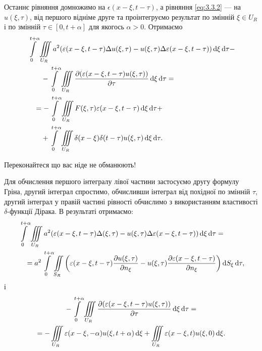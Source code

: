 Останнє рівняння домножимо на $\epsilon(x - \xi, t - \tau)$, а рівняння \eqref{eq:3.3.2} --- на $u(\xi, \tau)$, від першого відніме друге та проінтегруємо результат по змінній $\xi \in U_R$ і по змінній $\tau \in [0, t + \alpha]$ для якогось $\alpha > 0$. Отримаємо
\begin{equation}
	\begin{aligned}
		& \Int_0^{t + \alpha} \Iiint_{U_R} a^2 (\epsilon(x - \xi, t - \tau) \Delta u(\xi, \tau) - u(\xi, \tau) \Delta \epsilon(x - \xi, t - \tau)) \diff \xi \diff \tau - \\
		& \qquad - \Int_0^{t + \alpha} \Iiint_{U_R} \frac{\partial (\epsilon(x - \xi, t - \tau) u(\xi, \tau))}{\partial \tau} \diff \xi \diff \tau = \\
		& \quad = - \Int_0^{t + \alpha} \Iiint_{U_R} F(\xi, \tau) \epsilon(x - \xi, t - \tau) \diff \xi \diff \tau + \\
		& \qquad + \Int_0^{t + \alpha} \Iiint_{U_R} \delta(x - \xi) \delta(t - \tau) u(\xi, \tau) \diff \xi \diff \tau.
	\end{aligned}
\end{equation}

\begin{exercise}
	Переконайтеся що вас ніде не обманюють!
\end{exercise}

Для обчислення першого інтегралу лівої частини застосуємо другу формулу Гріна, другий інтеграл спростимо, обчисливши інтеграл від похідної по змінній $\tau$, другий інтеграл у правій частині рівності обчислимо з використанням властивості $\delta$-функції Дірака. В результаті отримаємо:
\begin{equation}
	\begin{aligned}
		& \displaystyle\int\limits_0^{t + \alpha} \displaystyle\iiint\limits_{U_R} a^2 (\varepsilon(x - \xi, t - \tau) \Delta(\xi, \tau) - u(\xi, \tau) \Delta \varepsilon(x - \xi, t - \tau)) \mathop{}\!\mathrm{d} \xi \mathop{}\!\mathrm{d} \tau = \\
		& \quad = a^2 \displaystyle\int\limits_0^{t + \alpha} \displaystyle\iint\limits_{S_R} \left( \varepsilon(x - \xi, t - \tau) \frac{\partial u(\xi, \tau)}{\partial n_\xi} - u(\xi, \tau) \frac{\partial \varepsilon(x - \xi, t - \tau)}{\partial n_\xi} \right) \mathop{}\!\mathrm{d} S_\xi \mathop{}\!\mathrm{d} \tau,
	\end{aligned}
\end{equation}
і
\begin{multline}
	- \displaystyle\int\limits_0^{t + \alpha} \displaystyle\iiint\limits_{U_R} \frac{\partial (\varepsilon(x - \xi, t - \tau) u(\xi, \tau))}{\partial \tau} \mathop{}\!\mathrm{d} \xi \mathop{}\!\mathrm{d} \tau = \\
	= - \displaystyle\iiint\limits_{U_R} \varepsilon(x - \xi, -\alpha) u(\xi, t + \alpha) \mathop{}\!\mathrm{d} \xi + \displaystyle\iiint\limits_{U_R} \varepsilon(x - \xi, t) u(\xi, 0) \mathop{}\!\mathrm{d} \xi.
\end{multline}

